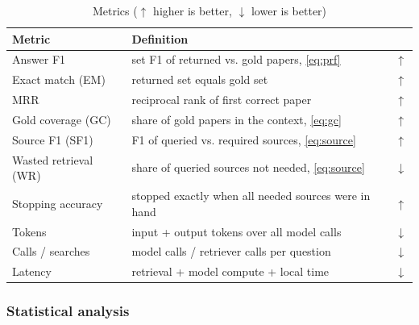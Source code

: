 \documentclass[conference]{IEEEtran}
\begin{document}
\begin{table}[!t]
\caption{Metrics ($\uparrow$ higher is better, $\downarrow$ lower is better)}
\label{tab:metrics}
\centering
\footnotesize
\setlength{\tabcolsep}{3pt}
\renewcommand{\arraystretch}{1.1}
\begin{tabular}{@{}>{\raggedright\arraybackslash}p{}>{\raggedright\arraybackslash}p{}>{\centering\arraybackslash}p{}@{}}
\toprule
\textbf{Metric} & \textbf{Definition} & \textbf{} \\
\midrule
Answer F1 & set F1 of returned vs. gold papers, \eqref{eq:prf} & $\uparrow$ \\
Exact match (EM) & returned set equals gold set & $\uparrow$ \\
MRR & reciprocal rank of first correct paper & $\uparrow$ \\
Gold coverage (GC) & share of gold papers in the context, \eqref{eq:gc} & $\uparrow$ \\
Source F1 (SF1) & F1 of queried vs. required sources, \eqref{eq:source} & $\uparrow$ \\
Wasted retrieval (WR) & share of queried sources not needed, \eqref{eq:source} & $\downarrow$ \\
Stopping accuracy & stopped exactly when all needed sources were in hand & $\uparrow$ \\
Tokens & input + output tokens over all model calls & $\downarrow$ \\
Calls / searches & model calls / retriever calls per question & $\downarrow$ \\
Latency & retrieval + model compute + local time & $\downarrow$ \\
\bottomrule
\end{tabular}
\end{table}

\subsubsection{Statistical analysis}
\end{document}
